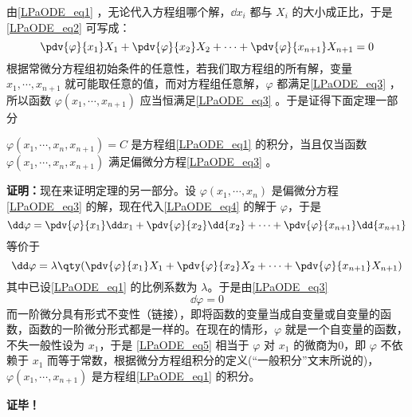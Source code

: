 由\autoref{LPaODE_eq1} ，无论代入方程组哪个解，$\dd x_i$ 都与 $X_i$ 的大小成正比，于是\autoref{LPaODE_eq2} 可写成：
\begin{equation}\label{LPaODE_eq3}
\pdv{\varphi}{x_1}X_1+\pdv{\varphi}{x_2}X_2+\cdots+\pdv{\varphi}{x_{n+1}}X_{n+1}=0
\end{equation}
根据常微分方程组初始条件的任意性，若我们取方程组的所有解，变量 $x_1,\cdots,x_{n+1}$ 就可能取任意的值，而对方程组任意解，$\varphi$ 都满足\autoref{LPaODE_eq3} ，所以函数 $\varphi(x_1,\cdots,x_{n+1})$ 应当恒满足\autoref{LPaODE_eq3} 。于是证得下面定理一部分
\begin{theorem}{}
 $\varphi(x_1,\cdots,x_n,x_{n+1})=C$ 是方程组\autoref{LPaODE_eq1} 的积分，当且仅当函数 $\varphi(x_1,\cdots,x_n,x_{n+1})$ 满足偏微分方程\autoref{LPaODE_eq3} 。
\end{theorem}
 \textbf{证明：}现在来证明定理的另一部分。设 $\varphi(x_1,\cdots,x_n)$ 是偏微分方程\autoref{LPaODE_eq3} 的解，现在代入\autoref{LPaODE_eq4} 的解于 $\varphi$，于是
 \begin{equation}
 \dd\varphi=\pdv{\varphi}{x_1}\dd x_1+\pdv{\varphi}{x_2}\dd{x_2}+\cdots+\pdv{\varphi}{x_{n+1}}\dd{x_{n+1}}
 \end{equation}
 等价于
 \begin{equation}
 \dd\varphi=\lambda\qty(\pdv{\varphi}{x_1}X_1+\pdv{\varphi}{x_2}X_2+\cdots+\pdv{\varphi}{x_{n+1}}X_{n+1})
 \end{equation}
 其中已设\autoref{LPaODE_eq1} 的比例系数为 $\lambda$。于是由\autoref{LPaODE_eq3} 
 \begin{equation}\label{LPaODE_eq5}
 \dd\varphi=0
 \end{equation}
 而一阶微分具有形式不变性（链接），即将函数的变量当成自变量或自变量的函数，函数的一阶微分形式都是一样的。在现在的情形，$\varphi$ 就是一个自变量的函数，不失一般性设为 $x_1$，于是 \autoref{LPaODE_eq5} 相当于 $\varphi$ 对 $x_1$ 的微商为0，即 $\varphi$ 不依赖于 $x_1$ 而等于常数，根据微分方程组积分的定义(“一般积分”文末所说的)，$\varphi(x_1,\cdots,x_{n+1})$ 是方程组\autoref{LPaODE_eq1} 的积分。

 \textbf{证毕！}